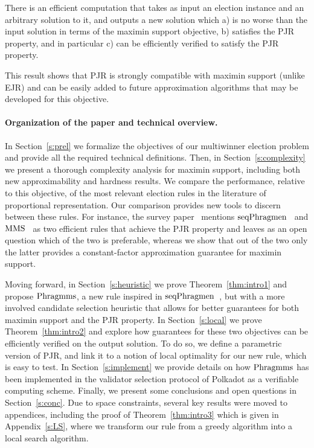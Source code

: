 \begin{theorem}\label{thm:intro3}
There is an efficient computation that takes as input an election instance and an arbitrary solution to it, and outputs a new solution which a) is no worse than the input solution in terms of the maximin support objective, b) satisfies the PJR property, and in particular c) can be efficiently verified to satisfy the PJR property.
\end{theorem}

This result shows that PJR is strongly compatible with maximin support (unlike EJR) and can be easily added to future approximation algorithms that may be developed for this objective.

\paragraph{Organization of the paper and technical overview.}
In Section~\ref{s:prel} we formalize the objectives of our multiwinner election problem and provide all the required technical definitions. 
Then, in Section~\ref{s:complexity} we present a thorough complexity analysis for maximin support, including both new approximability and hardness results. 
We compare the performance, relative to this objective, of the most relevant election rules in the literature of proportional representation. 
Our comparison provides new tools to discern between these rules. For instance, the survey paper~\cite{lackner2020approval} mentions $\operatorname{seqPhragmen}$~\cite{brill2017phragmen} and $\operatorname{MMS}$~\cite{sanchez2016maximin} as two efficient rules that achieve the PJR property and leaves as an open question which of the two is preferable, whereas we show that out of the two only the latter provides a constant-factor approximation guarantee for maximin support. 

Moving forward, in Section~\ref{s:heuristic} we prove Theorem~\ref{thm:intro1} and propose $\operatorname{Phragmms}$, a new rule inspired in $\operatorname{seqPhragmen}$~\cite{brill2017phragmen}, but with a more involved candidate selection heuristic that allows for better guarantees for both maximin support and the PJR property. 
In Section~\ref{s:local} we prove Theorem~\ref{thm:intro2} and explore how guarantees for these two objectives can be efficiently verified on the output solution. 
To do so, we define a parametric version of PJR, and link it to a notion of local optimality for our new rule, which is easy to test. 
In Section~\ref{s:implement} we provide details on how $\operatorname{Phragmms}$ has been implemented in the validator selection protocol of Polkadot as a verifiable computing scheme. 
Finally, we present some conclusions and open questions in Section~\ref{s:conc}. 
Due to space constraints, several key results were moved to appendices, including the proof of Theorem~\ref{thm:intro3} which is given in Appendix~\ref{s:LS}, where we transform our rule from a greedy algorithm into a local search algorithm. 

